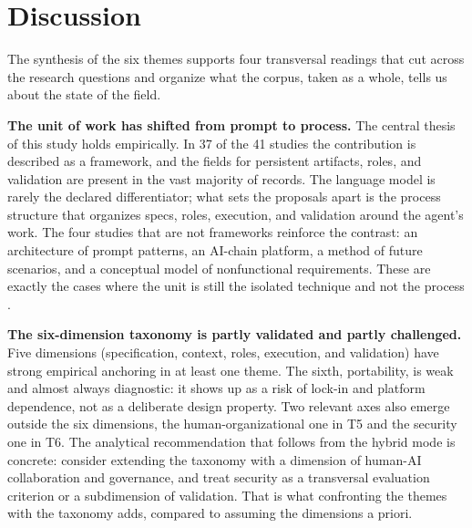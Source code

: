 \section{Discussion}

The synthesis of the six themes supports four transversal readings that cut across the research questions and organize what the corpus, taken as a whole, tells us about the state of the field.

\noindent\textbf{The unit of work has shifted from prompt to process.} The central thesis of this study holds empirically. In 37 of the 41 studies the contribution is described as a framework, and the fields for persistent artifacts, roles, and validation are present in the vast majority of records. The language model is rarely the declared differentiator; what sets the proposals apart is the process structure that organizes specs, roles, execution, and validation around the agent's work. The four studies that are not frameworks reinforce the contrast: an architecture of prompt patterns, an AI-chain platform, a method of future scenarios, and a conceptual model of nonfunctional requirements. These are exactly the cases where the unit is still the isolated technique and not the process \cite{JulesWhite2023,YuCheng2023,JSauvola2024,Zabardast2025}.

\noindent\textbf{The six-dimension taxonomy is partly validated and partly challenged.} Five dimensions (specification, context, roles, execution, and validation) have strong empirical anchoring in at least one theme. The sixth, portability, is weak and almost always diagnostic: it shows up as a risk of lock-in and platform dependence, not as a deliberate design property. Two relevant axes also emerge outside the six dimensions, the human-organizational one in T5 and the security one in T6. The analytical recommendation that follows from the hybrid mode is concrete: consider extending the taxonomy with a dimension of human-AI collaboration and governance, and treat security as a transversal evaluation criterion or a subdimension of validation. That is what confronting the themes with the taxonomy adds, compared to assuming the dimensions a priori.

